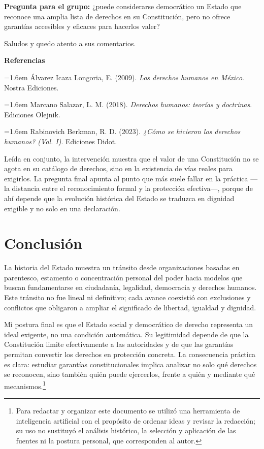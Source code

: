 \documentclass[
  spanish,
  letterpaper, oneside
]{article}
\begin{document}
\begin{forobox}[title={Participación publicada en el foro}]
\textbf{Pregunta para el grupo:} ¿puede considerarse democrático un Estado que reconoce una amplia lista de derechos en su Constitución, pero no ofrece garantías accesibles y eficaces para hacerlos valer?\par
\medskip
Saludos y quedo atento a sus comentarios.
\medskip
\par\noindent\textbf{Referencias}\par
{\setlength{\parskip}{0.35em}%
\par\noindent\hangindent=1.6em Álvarez Icaza Longoria, E. (2009). \textit{Los derechos humanos en México}. Nostra Ediciones.
\par\noindent\hangindent=1.6em Marcano Salazar, L. M. (2018). \textit{Derechos humanos: teorías y doctrinas}. Ediciones Olejnik.
\par\noindent\hangindent=1.6em Rabinovich Berkman, R. D. (2023). \textit{¿Cómo se hicieron los derechos humanos? (Vol. I)}. Ediciones Didot.
\par}
\end{forobox}

Leída en conjunto, la intervención muestra que el valor de una Constitución no se agota en su catálogo de derechos, sino en la existencia de vías reales para exigirlos. La pregunta final apunta al punto que más suele fallar en la práctica —la distancia entre el reconocimiento formal y la protección efectiva—, porque de ahí depende que la evolución histórica del Estado se traduzca en dignidad exigible y no solo en una declaración.

\clearpage
\section{Conclusión}

La historia del Estado muestra un tránsito desde organizaciones basadas en parentesco, estamento o concentración personal del poder hacia modelos que buscan fundamentarse en ciudadanía, legalidad, democracia y derechos humanos. Este tránsito no fue lineal ni definitivo; cada avance coexistió con exclusiones y conflictos que obligaron a ampliar el significado de libertad, igualdad y dignidad.

Mi postura final es que el Estado social y democrático de derecho representa un ideal exigente, no una condición automática. Su legitimidad depende de que la Constitución limite efectivamente a las autoridades y de que las garantías permitan convertir los derechos en protección concreta. La consecuencia práctica es clara: estudiar garantías constitucionales implica analizar no solo qué derechos se reconocen, sino también quién puede ejercerlos, frente a quién y mediante qué mecanismos.\footnote{Para redactar y organizar este documento se utilizó una herramienta de inteligencia artificial con el propósito de ordenar ideas y revisar la redacción; su uso no sustituyó el análisis histórico, la selección y aplicación de las fuentes ni la postura personal, que corresponden al autor.}

\clearpage
\nocite{notaEstadoHistoria2026,rabinovichBerkmanDerechosHumanos,marcanoSalazarDerechosHumanos,alvarezIcazaDerechosMexico}

\end{document}
